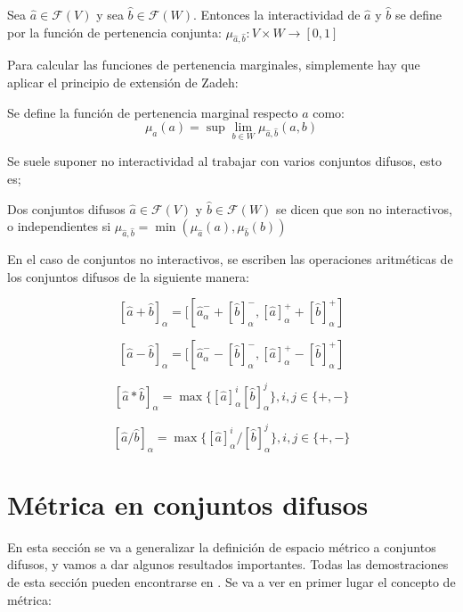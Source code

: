   \begin{definicion}
    Sea $\hat{a} \in \mathcal{F}(V)$ y sea $\hat{b} \in \mathcal{F}(W)$. Entonces la interactividad de $\hat{a}$ y $\hat{b}$ se define por la función de pertenencia conjunta: $\mu_{\hat{a}, \hat{b}} : V \times W \rightarrow [0, 1]$
  \end{definicion}
  Para calcular las funciones de pertenencia marginales, simplemente hay que aplicar el principio de extensión de Zadeh:

  \begin{definicion}
    Se define la función de pertenencia marginal respecto $a$ como:
    \[
    \mu_a(a) = \sup\lim\limits_{b \in W} \mu_{\hat{a}, \hat{b}} (a, b)
    \]
  \end{definicion}

  Se suele suponer no interactividad al trabajar con varios conjuntos difusos, esto es;

  \begin{definicion}
    Dos conjuntos difusos $\hat{a} \in \mathcal{F}(V)$ y $\hat{b} \in \mathcal{F}(W)$ se dicen que son no interactivos, o independientes si $\mu_{\hat{a}, \hat{b}} = \min(\mu_{\hat{a}}(a), \mu_{\hat{b}}(b))$
  \end{definicion}

  \begin{ejemplo}
    En el caso de conjuntos no interactivos, se escriben las operaciones aritméticas de los conjuntos difusos de la siguiente manera:

    \[
      [\hat{a} + \hat{b}]_\alpha = [[\hat{a}^-_\alpha + [\hat{b}]_\alpha^-, [\hat{a}]^+_\alpha + [\hat{b}]_\alpha^+]
        \]

        \[
          [\hat{a} - \hat{b}]_\alpha = [[\hat{a}^-_\alpha - [\hat{b}]_\alpha^-, [\hat{a}]^+_\alpha - [\hat{b}]_\alpha^+]
            \]

            \[
              [\hat{a} * \hat{b}]_\alpha = \max\{ [\hat{a}]_\alpha^i [\hat{b}]^j_\alpha \}, i, j \in \{+, -\}
              \]

              \[
                [\hat{a} / \hat{b}]_\alpha = \max\{ [\hat{a}]_\alpha^i / [\hat{b}]^j_\alpha \}, i, j \in \{+, -\}
                \]
  \end{ejemplo}

  \section{Métrica en conjuntos difusos}
  En esta sección se va a generalizar la definición de espacio métrico a conjuntos difusos, y vamos a dar algunos resultados importantes. Todas las demostraciones de esta sección pueden encontrarse en \cite{apuntesfuzzy}. Se va a ver en primer lugar el concepto de métrica:

